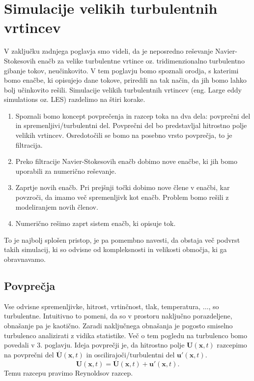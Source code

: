 \documentclass[mat2, tisk]{fmfdelo}
\newcommand{\bd}{\textbf}
\begin{document}
\newpage
\section{Simulacije velikih turbulentnih vrtincev}

V zaključku zadnjega poglavja smo videli, da je neposredno reševanje Navier-\\Stokesovih enačb
za velike turbulentne vrtince oz. tridimenzionalno turbulentno gibanje tokov, neučinkovito. V tem poglavju 
bomo spoznali orodja, s katerimi bomo enačbe, ki opisujejo dane tokove, priredili na tak
način, da jih bomo lahko bolj učinkovito rešili. Simulacije velikih turbulentnih vrtincev (eng. 
Large eddy simulations oz. LES) razdelimo na štiri korake. 
\begin{enumerate}
\item[i)] Spoznali bomo koncept povprečenja in razcep toka na dva dela: 
povprečni del in spremenljivi/turbulentni del. Povprečni del bo predstavljal hitrostno polje 
velikih vrtincev. Osredotočili se bomo na posebno vrsto povprečja, to je filtracija.
\item[ii)] Preko filtracije Navier-Stokesovih enačb dobimo nove enačbe, ki jih bomo 
uporabili za numerično reševanje. 
\item[iii)] Zaprtje novih enačb. Pri prejšnji točki dobimo nove člene v enačbi, kar 
povzroči, da imamo več spremenljivk kot enačb. Problem bomo rešili z modeliranjem 
novih členov.
\item[iv)] Numerično rešimo zaprt sistem enačb, ki opisuje tok.
\end{enumerate}

To je najbolj splošen pristop, je pa pomembno navesti, da obstaja več podvrst takih simulacij, 
ki so odvisne od kompleksnosti in velikosti območja, ki ga obravnavamo.

\subsection{Povprečja}

Vse odvisne spremenljivke, hitrost, vrtinčnost, tlak, temperatura, $\dots$, so turbulentne.
Intuitivno to pomeni, da so v prostoru naključno porazdeljene, obnašanje pa je kaotično.
Zaradi naključnega obnašanja je pogosto smiselno turbulenco 
analizirati z vidika statistike. Več o tem pogledu na turbulenco bomo povedali v $3$. poglavju. 
Ideja povprečji je, da hitrostno polje $\bd{U}(\bd{x}, t)$ razcepimo na povprečni del $\overline{\bd{U}}(\bd{x}, t)$ in 
oscilirajoči/turbulentni del $\bd{u}'(\bd{x}, t)$.
\begin{equation*}
\bd{U}(\bd{x}, t) = \overline{\bd{U}}(\bd{x},t) + \bd{u}'(\bd{x}, t).
\end{equation*}
Temu razcepu pravimo Reynoldsov razcep.
\end{document}
